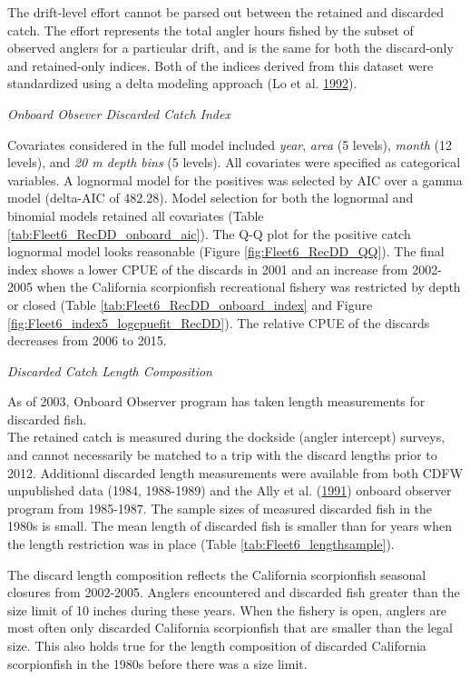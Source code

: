 \documentclass[12pt,]{article}
\begin{document}
The drift-level effort cannot be parsed out between the retained and
discarded catch. The effort represents the total angler hours fished by
the subset of observed anglers for a particular drift, and is the same
for both the discard-only and retained-only indices. Both of the indices
derived from this dataset were standardized using a delta modeling
approach (Lo et al. \protect\hyperlink{ref-Lo1992}{1992}).

\emph{Onboard Obsever Discarded Catch Index}

Covariates considered in the full model included \emph{year},
\emph{area} (5 levels), \emph{month} (12 levels), and \emph{20 m depth
bins} (5 levels). All covariates were specified as categorical
variables. A lognormal model for the positives was selected by AIC over
a gamma model (delta-AIC of 482.28). Model selection for both the
lognormal and binomial models retained all covariates (Table
\ref{tab:Fleet6_RecDD_onboard_aic}). The Q-Q plot for the positive catch
lognormal model looks reasonable (Figure \ref{fig:Fleet6_RecDD_QQ}). The
final index shows a lower CPUE of the discards in 2001 and an increase
from 2002-2005 when the California scorpionfish recreational fishery was
restricted by depth or closed (Table
\ref{tab:Fleet6_RecDD_onboard_index} and Figure
\ref{fig:Fleet6_index5_logcpuefit_RecDD}). The relative CPUE of the
discards decreases from 2006 to 2015.

\emph{Discarded Catch Length Composition}

As of 2003, Onboard Observer program has taken length measurements for
discarded fish.\\
The retained catch is measured during the dockside (angler intercept)
surveys, and cannot necessarily be matched to a trip with the discard
lengths prior to 2012. Additional discarded length measurements were
available from both CDFW unpublished data (1984, 1988-1989) and the Ally
et al. (\protect\hyperlink{ref-Ally1991}{1991}) onboard observer program
from 1985-1987. The sample sizes of measured discarded fish in the 1980s
is small. The mean length of discarded fish is smaller than for years
when the length restriction was in place (Table
\ref{tab:Fleet6_lengthsample}).

The discard length composition reflects the California scorpionfish
seasonal closures from 2002-2005. Anglers encountered and discarded fish
greater than the size limit of 10 inches during these years. When the
fishery is open, anglers are most often only discarded California
scorpionfish that are smaller than the legal size. This also holds true
for the length composition of discarded California scorpionfish in the
1980s before there was a size limit.
\end{document}
